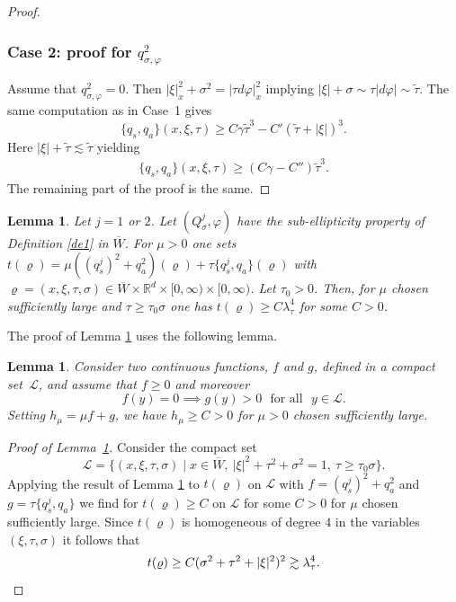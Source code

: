 \documentclass[JEP,XML,SOM,Unicode,published]{cedram}
\let\sep\mid
\theoremstyle{plain}
\newtheorem{lemma}[theorem]{Lemma}
\theoremstyle{definition}
\def\R{\mathbb{R}}
\newcommand{\suff}{sufficiently\xspace}
\let\csp\gamma
\let\y\varrho
\newcommand{\ovl}[1]{\overline{#1}}
\newcommand{\lsc}{\lambda_\tau}
\newcommand{\Qsig}{Q_{\sigma}}
\newcommand{\qconj}{q_{\sigma,\varphi}}
\newcommand{\qs}{q_{s}}
\newcommand{\qa}{q_{a}}
\begin{document}
\begin{proof}
\subsubsection*{Case 2: proof for ${\qconj^2}$}
Assume
that $\qconj^2=0$. Then $|\xi|_x^2+\sigma^2=|\tau
d\varphi|_x^2$ implying $|\xi|+\sigma\sim\tau|d\varphi| \sim \tilde{\tau}$.
The same computation as in Case~1 gives
\begin{equation*}
\{\qs, \qa\}(x,\xi,\tau) \geq C \csp\tilde{\tau}^3-C'(\tilde{\tau}+|\xi|)^3.
\end{equation*}
Here $|\xi|+\tilde{\tau}\lesssim \tilde{\tau}$ yielding
\begin{align*}
\{\qs, \qa\}(x,\xi,\tau) \geq (C \csp-C'')\tilde{\tau}^3.
\end{align*}
The remaining part of the proof is the same.
\end{proof}

\begin{lemma}\label{urg1}
Let $j=1$ or $2$. Let $(\Qsig^j,\varphi)$ have the sub-ellipticity property
of Definition \ref{de1} in $\ovl{W}$. For $\mu>0$ one sets
$t(\y)=\mu
((\qs^j)^2+\qa^2)(\y)+\tau\{\qs^j,\qa\}(\y)$
with
$\y=(x,\xi,\tau,\sigma)\in\ovl{W}\times\R^d\times[0,\infty)\times[0,\infty)$.
Let $\tau_0 >0$. Then, for $\mu$ chosen \suff large and
$\tau\geq \tau_0\sigma$ one has $t(\y)\geq C\lsc^4$
for some $C>0$.
\end{lemma}
The proof of Lemma \ref{urg1} uses the following lemma.

\begin{lemma}\label{urg2}
Consider two continuous functions, $f$ and $g$, defined in a compact set~$\mathscr{L}$, and assume that $f\geq 0$ and moreover
\[
f(y)=0\implies g(y)>0~~~\text{for all}~~~y\in\mathscr{L}.
\]
Setting $h_{\mu}=\mu f+g$, we have $h_{\mu}\geq C>0$ for $\mu>0$ chosen \suff large.
\end{lemma}
\begin{proof}[Proof of Lemma~\ref{urg1}]
Consider the compact set
\begin{equation*}
\mathscr{L}=
\{(x,\xi,\tau,\sigma)\sep x\in\ovl{W},\
|\xi|^2+\tau^2+\sigma^2=1, \ \tau\geq \tau_0\sigma\}.
\end{equation*}
Applying the result of Lemma \ref{urg2} to $t(\y)$ on
$\mathscr{L}$ with $f=(\qs^j)^2+\qa^2$ and $g=\tau\{\qs^j,
\qa\}$ we find for $t(\y)\geq C$ on $\mathscr{L}$ for some
$C>0$ for $\mu$
chosen \suff large. Since $t(\y)$ is homogeneous of degree $4$
in the variables $(\xi,\tau,\sigma)$ it follows that
\[
t(\y)\geq C(\sigma^2+\tau^2+|\xi|^2)^2\gtrsim \lsc^4.\qedhere
\]
\end{proof}
\end{document}
